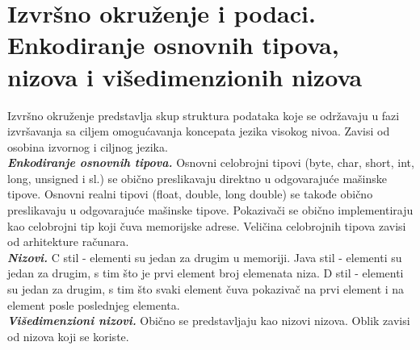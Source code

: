 \documentclass[10pt]{extarticle}
\begin{document}
\section{Izvršno okruženje i podaci. Enkodiranje osnovnih tipova, nizova i višedimenzionih nizova}
\noindent
Izvršno okruženje predstavlja skup struktura podataka koje se održavaju u fazi izvršavanja sa ciljem omogućavanja koncepata jezika visokog nivoa. Zavisi od osobina izvornog i ciljnog jezika. \\
\textit{\textbf{Enkodiranje osnovnih tipova.}} Osnovni celobrojni tipovi (byte, char, short, int, long, unsigned i sl.) se obično preslikavaju direktno u odgovarajuće mašinske tipove. Osnovni realni tipovi (float, double, long double) se takođe obično preslikavaju u odgovarajuće mašinske tipove. Pokazivači se obično implementiraju kao celobrojni tip koji čuva memorijske adrese. Veličina celobrojnih tipova zavisi od arhitekture računara. \\
\textit{\textbf{Nizovi.}} C stil - elementi su jedan za drugim u memoriji. Java stil - elementi su jedan za drugim, s tim što je prvi element broj elemenata niza. D stil - elementi su jedan za drugim, s tim što svaki element čuva pokazivač na prvi element i na element posle poslednjeg elementa. \\
\textit{\textbf{Višedimenzioni nizovi.}} Obično se predstavljaju kao nizovi nizova. Oblik zavisi od nizova koji se koriste.
\end{document}
